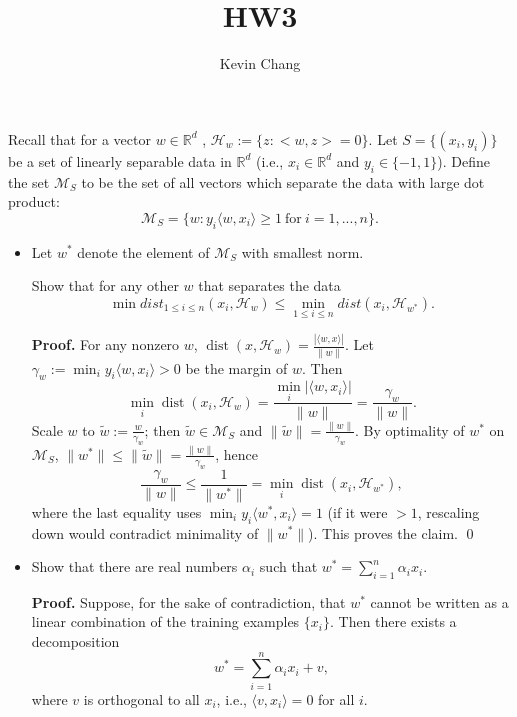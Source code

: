 \documentclass[a4paper]{article}
\title{HW3}
\author{Kevin Chang}
\begin{document}
\maketitle

\section{}
Recall that for a vector $w \in \mathbb{R}^d$ , $\mathcal{H}_w := \{z : <w, z> = 0\}$.
Let $S = \{(x_i , y_i )\}$ be a set of linearly separable data in $\mathbb{R}^d$ (i.e., $x_i \in \mathbb{R}^d$ and $y_i \in \{-1, 1\}$).
Define the set $\mathcal{M}_S$ to be the set of all vectors which separate the data with large dot product:
$$\mathcal{M}_S = \{w : y_i \langle w, x_i \rangle \geq 1 \ \text{for} \ i = 1, . . . , n\}.$$
\begin{itemize}
    \item Let $w^*$ denote the element of $\mathcal{M}_S$ with smallest norm.

Show that for any other $w$ that separates the data
$$\min \mathit{dist}_{1\leq i\leq n}(x_i , \mathcal{H}_w ) \leq \min_{1\leq i\leq n} \mathit{dist}(x_i , \mathcal{H}_{w^*}) .$$

\textbf{Proof.}
For any nonzero $w$, $\operatorname{dist}(x,\mathcal{H}_w)=\frac{|\langle w,x\rangle|}{\|w\|}$.  
Let $\gamma_w:=\min_i y_i\langle w,x_i\rangle>0$ be the margin of $w$. Then
\[
\min_i \operatorname{dist}(x_i,\mathcal{H}_w)
= \frac{\min_i |\langle w,x_i\rangle|}{\|w\|}
= \frac{\gamma_w}{\|w\|}.
\]
Scale $w$ to $\tilde w:=\frac{w}{\gamma_w}$; then $\tilde w\in\mathcal{M}_S$ and
$\|\tilde w\|=\frac{\|w\|}{\gamma_w}$. By optimality of $w^*$ on $\mathcal{M}_S$,
$\|w^*\|\le \|\tilde w\|=\frac{\|w\|}{\gamma_w}$, hence
\[
\frac{\gamma_w}{\|w\|}\le \frac{1}{\|w^*\|}
= \min_i \operatorname{dist}(x_i,\mathcal{H}_{w^*}),
\]
where the last equality uses $\min_i y_i\langle w^*,x_i\rangle=1$ (if it were $>1$, rescaling down would contradict minimality of $\|w^*\|$). This proves the claim. \qed

    \item Show that there are real numbers $\alpha_i$ such that $w^* = \sum_{i=1}^n \alpha_i x_i$.

\textbf{Proof.}  
Suppose, for the sake of contradiction, that $w^*$ cannot be written as a linear combination of the training examples $\{x_i\}$.  
Then there exists a decomposition
\[
w^* = \sum_{i=1}^n \alpha_i x_i + v,
\]
where $v$ is orthogonal to all $x_i$, i.e., $\langle v, x_i \rangle = 0$ for all $i$.


\end{itemize}
\end{document}
